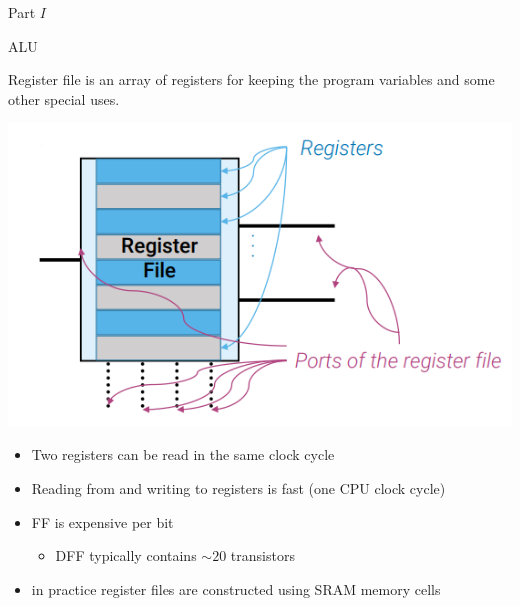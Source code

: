 \begin{parag}{Part $I$}
\begin{subparag}{ALU}
        \end{subparag}
        \begin{subparag}{Register file}
             is an array of registers for keeping the program variables and some other special uses.
            \begin{center}
                \includegraphics[scale=0.5]{152025-06-20.png}
            \end{center}
            \begin{itemize}
                \item Two registers can be read in the same clock cycle
                \item Reading from and writing to registers is fast (one CPU clock cycle)
                \item FF is expensive per bit
                    \begin{itemize}
                        \item DFF typically contains $\sim 20$ transistors
                    \end{itemize}
                    \item  in practice register files are constructed using SRAM memory cells
            \end{itemize}
            

\end{subparag}
\end{parag}
